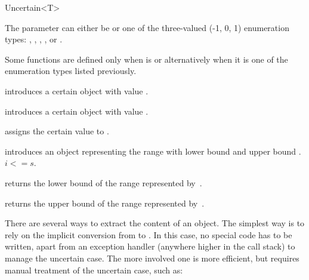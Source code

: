 \begin{ccRefClass}{Uncertain<T>}

  \ccParameters

  The parameter  can either be  or one of the three-valued
  (-1, 0, 1) enumeration types: , ,
  , ,  or .

  Some functions are defined only when  is  or alternatively
  when it is one of the enumeration types listed previously.


  \ccTypes
  \ccPropagateThreeToTwoColumns



  \ccCreation

  {introduces a certain object with value .}

  {introduces a certain object with value .}

  {assigns the certain value  to \ccVar.}

  {introduces an object representing the range with lower bound  and
  upper bound . \ccPrecond $ i<= s$. }


  {returns the lower bound of the range represented by~\ccVar.}

  \ccGlue{}
  {returns the upper bound of the range represented by~\ccVar.}


  There are several ways to extract the content of an  object.  The simplest way is to
  rely on the implicit conversion from  to .  In this case, no special
  code has to be written, apart from an exception handler (anywhere higher in the call stack) to manage
  the uncertain case.  The more involved one is more efficient, but requires manual treatment
  of the uncertain case, such as:


\end{ccRefClass}
